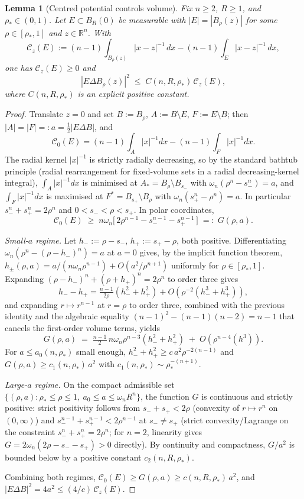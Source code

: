 \documentclass[11pt]{amsart}
\newtheorem{lemma}[theorem]{Lemma}
\theoremstyle{definition}
\newcommand{\R}{\mathbb R}
\newcommand{\rstar}{\rho_*}
\begin{document}
\begin{lemma}[Centred potential controls volume]\label{lem:centred-potential}
Fix \(n\ge2\), \(R\ge1\), and \(\rstar\in(0,1)\).  Let \(E\subset B_R(0)\) be
measurable with \(|E|=|B_\rho(z)|\) for some \(\rho\in[\rstar,1]\) and
\(z\in\R^n\).  With
\[
   \mathcal C_z(E):=(n-1)\!\int_{B_\rho(z)}|x-z|^{-1}\,dx
   -(n-1)\!\int_E|x-z|^{-1}\,dx,
\]
one has \(\mathcal C_z(E)\ge0\) and
\[
   |E\Delta B_\rho(z)|^2\;\le\; C(n,R,\rstar)\,\mathcal C_z(E),
\]
where \(C(n,R,\rstar)\) is an explicit positive constant.
\end{lemma}

\begin{proof}
Translate \(z=0\) and set \(B:=B_\rho\), \(A:=B\setminus E\),
\(F:=E\setminus B\); then \(|A|=|F|=:a=\tfrac12|E\Delta B|\), and
\[
   \mathcal C_0(E)=(n-1)\!\int_A|x|^{-1}dx-(n-1)\!\int_F|x|^{-1}dx.
\]
The radial kernel \(|x|^{-1}\) is strictly radially decreasing, so by the
standard bathtub principle (radial rearrangement for fixed-volume sets in a
radial decreasing-kernel integral),
\(\int_A|x|^{-1}dx\) is minimised at \(A_*=B_\rho\setminus B_{s_-}\) with
\(\omega_n(\rho^n-s_-^n)=a\), and \(\int_F|x|^{-1}dx\) is maximised at
\(F^*=B_{s_+}\setminus B_\rho\) with \(\omega_n(s_+^n-\rho^n)=a\).  In
particular \(s_-^n+s_+^n=2\rho^n\) and \(0<s_-<\rho<s_+\).  In polar
coordinates,
\[
   \mathcal C_0(E)\;\ge\;n\omega_n\bigl[\,2\rho^{n-1}-s_-^{n-1}-s_+^{n-1}\,\bigr]
   \;=:\;G(\rho,a).
\]

\emph{Small-\(a\) regime.}  Let \(h_-:=\rho-s_-\), \(h_+:=s_+-\rho\), both
positive.  Differentiating \(\omega_n(\rho^n-(\rho-h_-)^n)=a\) at \(a=0\)
gives, by the implicit function theorem, \(h_\pm(\rho,a)=a/(n\omega_n
\rho^{n-1})+O(a^2/\rho^{n+1})\) uniformly for \(\rho\in[\rstar,1]\).
Expanding \((\rho-h_-)^n+(\rho+h_+)^n=2\rho^n\) to order three gives
\[
   h_--h_+=\tfrac{n-1}{2\rho}(h_-^2+h_+^2)+O(\rho^{-2}(h_-^3+h_+^3)),
\]
and expanding \(r\mapsto r^{n-1}\) at \(r=\rho\) to order three, combined
with the previous identity and the algebraic equality
\((n-1)^2-(n-1)(n-2)=n-1\) that cancels the first-order volume terms, yields
\[
   G(\rho,a)\;=\;\tfrac{n-1}{2}\,n\omega_n\rho^{n-3}(h_-^2+h_+^2)
   \;+\;O(\rho^{n-4}(h^3)).
\]
For \(a\le a_0(n,\rstar)\) small enough, \(h_-^2+h_+^2\ge c\,a^2\rho^{-2(n-1)}\)
and \(G(\rho,a)\ge c_1(n,\rstar)\,a^2\) with
\(c_1(n,\rstar)\sim\rstar^{-(n+1)}\).

\emph{Large-\(a\) regime.}  On the compact admissible set
\(\{(\rho,a):\rstar\le\rho\le1,\ a_0\le a\le\omega_n R^n\}\), the function
\(G\) is continuous and strictly positive: strict positivity follows from
\(s_-+s_+<2\rho\) (convexity of \(r\mapsto r^n\) on \((0,\infty)\)) and
\(s_-^{n-1}+s_+^{n-1}<2\rho^{n-1}\) at \(s_-\ne s_+\) (strict
convexity/Lagrange on the constraint \(s_-^n+s_+^n=2\rho^n\); for \(n=2\),
linearity gives \(G=2\omega_n(2\rho-s_--s_+)>0\) directly).  By continuity and
compactness, \(G/a^2\) is bounded below by a positive constant
\(c_2(n,R,\rstar)\).

Combining both regimes, \(\mathcal C_0(E)\ge G(\rho,a)\ge c(n,R,\rstar)\,a^2\),
and \(|E\Delta B|^2=4a^2\le (4/c)\,\mathcal C_z(E)\).
\end{proof}
\end{document}

